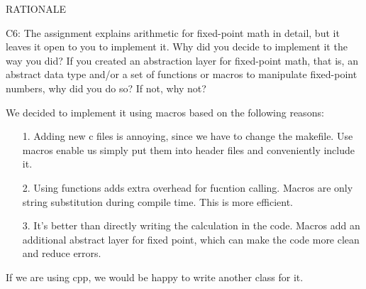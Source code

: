 \begin{aspect}{RATIONALE}
  \begin{qc}
    C6: The assignment explains arithmetic for fixed-point math in detail, but it leaves it open to you to implement it.  Why did you decide to implement it the way you did?  If you created an abstraction layer for fixed-point math, that is, an abstract data type and/or a set of functions or macros to manipulate fixed-point numbers, why did you do so?  If not, why not?
  \end{qc}
  We decided to implement it using macros based on the following reasons:
  \begin{itemize}
    \item[1.] Adding new c files is annoying, since we have to change the makefile. Use macros enable us simply put them into header files and conveniently include it.
    \item[2.] Using functions adds extra overhead for fucntion calling. Macros are only string substitution during compile time. This is more efficient.
    \item[3.] It's better than directly writing the calculation in the code. Macros add an additional abstract layer for fixed point, which can make the code more clean and reduce errors.
  \end{itemize}
  If we are using cpp, we would be happy to write another class for it.
\end{aspect}